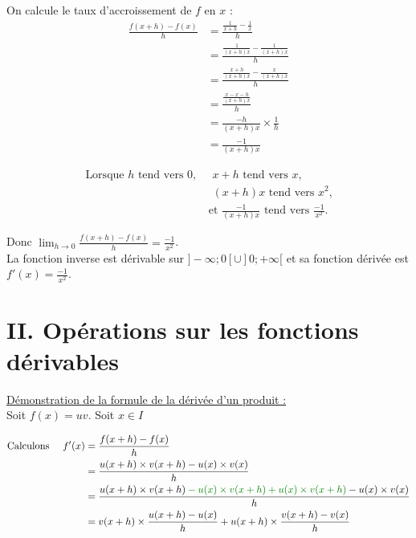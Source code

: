 \documentclass[11pt,a4paper]{article}
\begin{document}
            On calcule le taux d'accroissement de $f$ en $x$ :
            \begin{equation*}
                \begin{split}
                    \frac{f(x+h)-f(x)}{h}&=\frac{\frac{1}{x+h}-\frac{1}{x}}{h}\\
                    &=\frac{\frac{1}{(x+h)x}-\frac{1}{(x+h)x}}{h} \\
                    &=\frac{\frac{x+h}{(x+h)x}-\frac{x}{(x+h)x}}{h}\\
                    &=\frac{\frac{x-x-h}{(x+h)x}}{h}\\
                    &=\frac{-h}{(x+h)x}\times\frac{1}{h}\\
                    &=\frac{-1}{(x+h)x}
                \end{split}
            \end{equation*}

            \begin{equation*}
                \begin{split}
                    \text{Lorsque $h$ tend vers $0$,}&\text{ $x+h$ tend vers $x$,}\\
                    &\text{ $(x+h)x$ tend vers $x^2$,}\\
                    &\text{ et $\frac{-1}{(x+h)x}$ tend vers $\frac{-1}{x^2}$.}
                \end{split}
            \end{equation*}

            Donc $\displaystyle{\lim_{h\to0}\frac{f(x+h)-f(x)}{h}}=\frac{-1}{x^2}$. ~\\

            La fonction inverse est dérivable sur $]-\infty;0[\cup]0;+\infty[$ et sa fonction dérivée est $f'(x)=\frac{-1}{x^2}$.

\section*{II. Opérations sur les fonctions dérivables}

\underline{Démonstration de la formule de la dérivée d'un produit :} ~\\

Soit $f(x)=uv$. Soit $x\in I$

\begin{alignat*}{2}
     & \text{Calculons } & f'(x) & = \frac{f(x+h)-f(x)}{h}                                                                     \\
     &                   &       & = \frac{u(x+h)\times v(x+h) - u(x) \times v(x)}{h}                                          \\
     &                   &       & = \frac{u(x+h)\times v(x+h) \color{dark_green} -u(x)\times v(x+h) +u(x)\times v(x+h) \color{black}  - u(x) \times v(x)}{h} \\
     &                   &       & = v(x+h)\times \frac{u(x+h)-u(x)}{h} + u(x+h)\times \frac{v(x+h)-v(x)}{h}
\end{alignat*}
\end{document}
